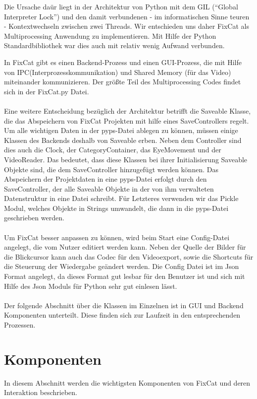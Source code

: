 \documentclass[a4paper,draft]{scrartcl}
\begin{document}
Die Ursache da\"ur liegt in der Architektur von Python mit dem GIL ("`Global Interpreter Lock"') und den damit verbundenen - im informatischen Sinne teuren - Kontextwechseln zwischen zwei Threads.
Wir entschieden uns daher FixCat als Multiprocessing Anwendung zu implementieren.
Mit Hilfe der Python Standardbibliothek war dies auch mit relativ wenig Aufwand verbunden.

In FixCat gibt es einen Backend-Prozess und einen GUI-Prozess, die mit Hilfe von IPC(Interprozesskommunikation) und Shared Memory (für das Video) miteinander kommunizieren.
Der gr\"o\ss te Teil des Multiprocessing Codes findet sich in der FixCat.py Datei.
\\ \\
Eine weitere Entscheidung bezüglich der Architektur betrifft die Saveable Klasse, die das Abspeichern von FixCat Projekten mit hilfe eines SaveControllers regelt. Um alle wichtigen Daten in der pyps-Datei ablegen zu können, müssen einige Klassen des Backends deshalb von Saveable erben. Neben dem Controller sind dies auch die Clock, der CategoryContainer, das EyeMovement und der VideoReader. Das bedeutet, dass diese Klassen bei ihrer Initialisierung Saveable Objekte sind, die dem SaveController hinzugefügt werden können. Das Abspeichern der Projektdaten in eine pyps-Datei erfolgt durch den SaveController, der alle Saveable Objekte in der von ihm verwalteten Datenstruktur in eine Datei schreibt. Für Letzteres verwenden wir das Pickle Modul, welches Objekte in Strings umwandelt, die dann in die pyps-Datei geschrieben werden. 
\\ \\
Um FixCat besser anpassen zu können, wird beim Start eine Config-Datei angelegt, die vom Nutzer editiert werden kann. Neben der Quelle der Bilder für die Blickcursor kann auch das Codec für den Videoexport, sowie die Shortcuts für die Steuerung der Wiedergabe geändert werden. Die Config Datei ist im Json Format angelegt, da dieses Format gut lesbar für den Benutzer ist und sich mit Hilfe des Json Moduls für Python sehr gut einlesen lässt. 
\\ \\
Der folgende Abschnitt über die Klassen im Einzelnen ist in GUI und Backend Komponenten unterteilt.
Diese finden sich zur Laufzeit in den entsprechenden Prozessen.

\section{Komponenten}
In diesem Abschnitt werden die wichtigsten Komponenten von FixCat und deren Interaktion beschrieben.
\end{document}
